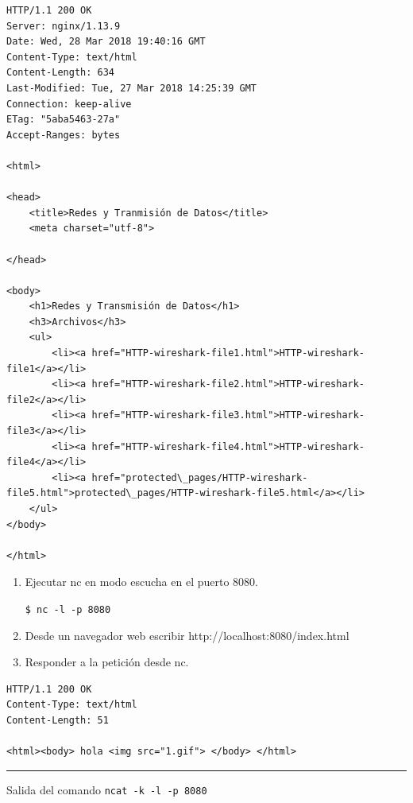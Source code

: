 \documentclass[11pt]{article}
\begin{document}
    \begin{Verbatim}[commandchars=\\\{\}]
HTTP/1.1 200 OK
Server: nginx/1.13.9
Date: Wed, 28 Mar 2018 19:40:16 GMT
Content-Type: text/html
Content-Length: 634
Last-Modified: Tue, 27 Mar 2018 14:25:39 GMT
Connection: keep-alive
ETag: "5aba5463-27a"
Accept-Ranges: bytes

<html>

<head>
    <title>Redes y Tranmisión de Datos</title>
    <meta charset="utf-8">

</head>

<body>
    <h1>Redes y Transmisión de Datos</h1>
    <h3>Archivos</h3>
    <ul>
        <li><a href="HTTP-wireshark-file1.html">HTTP-wireshark-file1</a></li>
        <li><a href="HTTP-wireshark-file2.html">HTTP-wireshark-file2</a></li>
        <li><a href="HTTP-wireshark-file3.html">HTTP-wireshark-file3</a></li>
        <li><a href="HTTP-wireshark-file4.html">HTTP-wireshark-file4</a></li>
        <li><a href="protected\_pages/HTTP-wireshark-file5.html">protected\_pages/HTTP-wireshark-file5.html</a></li>
    </ul>
</body>

</html>
    \end{Verbatim}

    \begin{enumerate}
\def\labelenumi{\arabic{enumi}.}
\item
  Ejecutar nc en modo escucha en el puerto 8080.

  \texttt{\$\ nc\ -l\ -p\ 8080}
\item
  Desde un navegador web escribir http://localhost:8080/index.html
\item
  Responder a la petición desde nc.
\end{enumerate}

\begin{verbatim}
HTTP/1.1 200 OK
Content-Type: text/html
Content-Length: 51

<html><body> hola <img src="1.gif"> </body> </html>
\end{verbatim}

\begin{center}\rule{0.5\linewidth}{\linethickness}\end{center}

Salida del comando \texttt{ncat\ -k\ -l\ -p\ 8080}
\end{document}
